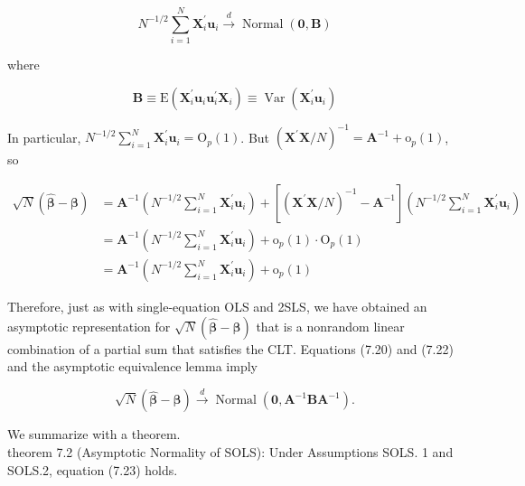 \documentclass[10pt]{article}
\begin{document}
\begin{equation*}
N^{-1 / 2} \sum_{i=1}^{N} \mathbf{X}_{i}^{\prime} \mathbf{u}_{i} \xrightarrow{d} \operatorname{Normal}(\mathbf{0}, \mathbf{B}) \tag{7.20}
\end{equation*}


where


\begin{equation*}
\mathbf{B} \equiv \mathrm{E}\left(\mathbf{X}_{i}^{\prime} \mathbf{u}_{i} \mathbf{u}_{i}^{\prime} \mathbf{X}_{i}\right) \equiv \operatorname{Var}\left(\mathbf{X}_{i}^{\prime} \mathbf{u}_{i}\right) \tag{7.21}
\end{equation*}


In particular, $N^{-1 / 2} \sum_{i=1}^{N} \mathbf{X}_{i}^{\prime} \mathbf{u}_{i}=\mathrm{O}_{p}(1)$. But $\left(\mathbf{X}^{\prime} \mathbf{X} / N\right)^{-1}=\mathbf{A}^{-1}+\mathrm{o}_{p}(1)$, so


\begin{align*}
\sqrt{N}(\hat{\boldsymbol{\beta}}-\boldsymbol{\beta}) & =\mathbf{A}^{-1}\left(N^{-1 / 2} \sum_{i=1}^{N} \mathbf{X}_{i}^{\prime} \mathbf{u}_{i}\right)+\left[\left(\mathbf{X}^{\prime} \mathbf{X} / N\right)^{-1}-\mathbf{A}^{-1}\right]\left(N^{-1 / 2} \sum_{i=1}^{N} \mathbf{X}_{i}^{\prime} \mathbf{u}_{i}\right) \\
& =\mathbf{A}^{-1}\left(N^{-1 / 2} \sum_{i=1}^{N} \mathbf{X}_{i}^{\prime} \mathbf{u}_{i}\right)+\mathrm{o}_{p}(1) \cdot \mathrm{O}_{p}(1) \\
& =\mathbf{A}^{-1}\left(N^{-1 / 2} \sum_{i=1}^{N} \mathbf{X}_{i}^{\prime} \mathbf{u}_{i}\right)+\mathrm{o}_{p}(1) \tag{7.22}
\end{align*}


Therefore, just as with single-equation OLS and 2SLS, we have obtained an asymptotic representation for $\sqrt{N}(\hat{\boldsymbol{\beta}}-\boldsymbol{\beta})$ that is a nonrandom linear combination of a partial sum that satisfies the CLT. Equations (7.20) and (7.22) and the asymptotic equivalence lemma imply


\begin{equation*}
\sqrt{N}(\hat{\boldsymbol{\beta}}-\boldsymbol{\beta}) \xrightarrow{d} \operatorname{Normal}\left(\mathbf{0}, \mathbf{A}^{-1} \mathbf{B A}^{-1}\right) . \tag{7.23}
\end{equation*}


We summarize with a theorem.\\
theorem 7.2 (Asymptotic Normality of SOLS): Under Assumptions SOLS. 1 and SOLS.2, equation (7.23) holds.
\end{document}
